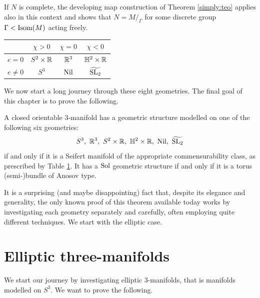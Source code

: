 If $N$ is complete, the developing map construction of Theorem \ref{simply:teo} applies also in this context and shows that $N = M/_\Gamma$ for some discrete group $\Gamma <{\rm Isom}(M)$ acting freely. 

\begin{table}
\begin{center}
\begin{tabular}{c||ccc}
       & \phantom{\Big|} $\chi>0$ & $\chi = 0$ & $\chi<0$ \\
 \hline \hline
 $e=0$ & \phantom{\Big|} $S^2 \times \mathbb{R}$ & $\mathbb{R}^3$ & $\mathbb{H}^2 \times \mathbb{R}$ \\
 $e\neq 0$ & \phantom{\big|} $S^3$ & ${\rm Nil}$ & $\widetilde {{\rm SL}_2}$
\end{tabular}
\vspace{.2 cm}
\label{Seifert:geometry:table}
\end{center}
\end{table}

We now start a long journey through these eight geometries. The final goal of this chapter is to prove the following.

\begin{teo} \label{Seifert:geometrisation:teo}
A closed orientable 3-manifold has a geometric structure modelled on one of the following six geometries:
$$S^3,\ \mathbb{R}^3,\ S^2\times \mathbb{R},\ \mathbb{H}^2\times \mathbb{R},\ {\rm Nil},\ \widetilde{{\rm SL}_2}$$
if and only if it is a Seifert manifold of the appropriate commensurability class, as prescribed by Table \ref{Seifert:geometry:table}. It has a ${\rm Sol}$ geometric structure if and only if it is a torus (semi-)bundle of Anosov type.
\end{teo}

It is a surprising (and maybe disappointing) fact that, despite its elegance and generality, the only known proof of this theorem available today works by investigating each geometry separately and carefully, often employing quite different techniques. We start with the elliptic case.

\section{Elliptic three-manifolds}
We start our journey by investigating elliptic 3-manifolds, that is manifolds modelled on $S^3$. We want to prove the following.

